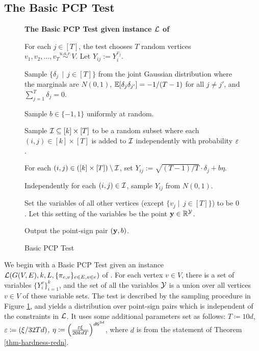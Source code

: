 \subsection{The Basic PCP Test}\label{sec-basic-pcp-test}

\begin{figure}[t]
\begin{mdframed}
\begin{center}\textbf{The Basic PCP Test given instance $\mathcal{L}$ of \LC}\end{center}
\begin{enumerate*}

\item For each $j \in [T]$, the test chooses $T$ random vertices $v_1,v_2,\ldots,v_T \overset{u.a.r.}{\sim} V$.
Let $Y_{ij} := Y^{v_j}_i$.

\item Sample $\{\delta_{j}\, \mid\, j\in[T]\}$ from the joint Gaussian
	distribution where the marginals are $N(0,1)$,
	$\mathbb{E}[\delta_j\delta_{j'}] = -1/(T-1)$ for all $j\neq j'$, 
	and $\sum_{j=1}^T \delta_{j} = 0$. 


\item Sample $b \in \{-1,1\}$ uniformly at random.

\item Sample $\mathcal{I} \subseteq [k]\times[T]$ to be a random subset
where each $(i,j) \in [k]\times[T]$ is added to $\mathcal{I}$
independently with probability $\varepsilon$.

\item For each $(i,j) \in ([k]\times[T])\setminus \mathcal{I}$, set $Y_{ij} := \sqrt{{(T-1)}/{T}}\cdot \delta_{j} +
b\eta.$

\item Independently for each $(i,j) \in \mathcal{I}$,
sample  $Y_{ij}$ from $N(0,{1})$. 

\item Set the variables of all other vertices (except $\{v_j
\mid\, j \in [T]\}$) to be $0$. Let this setting of the variables be the point ${\bf y} \in \mathbb{R}^{\mc{Y}}$.

\item Output the point-sign pair $({\bf y},b)$.

\end{enumerate*}
\end{mdframed}
\caption{Basic PCP Test}
\label{fig:pcptest}
\end{figure}



We begin with a Basic PCP Test given an instance
 $\mathcal{L}(G(V, E),k,L, \{\pi_{e,v}\}_{e \in E,v \in e})$ of \LC.  
For each vertex $v
\in V$, there is a set of variables $\{Y^v_i\}_{i=1}^k$, and the set
of all the variables $\mathcal{Y}$ is a union over all vertices $v \in V$ of these variable sets. 
The test is described by  
the sampling procedure in Figure \ref{fig:pcptest}, and yields a distribution over point-sign pairs which is independent of the constraints in $\mathcal{L}$. It uses some additional parameters set as follows: $T \coloneqq 10d$, $\varepsilon \coloneqq (\xi/32Td)$, $\eta \coloneqq \Big(\frac{\varepsilon\xi}{20kdT}\Big)^{d6^{3d}}$, where $d$ is from the statement of Theorem \ref{thm-hardness-redn}. 


